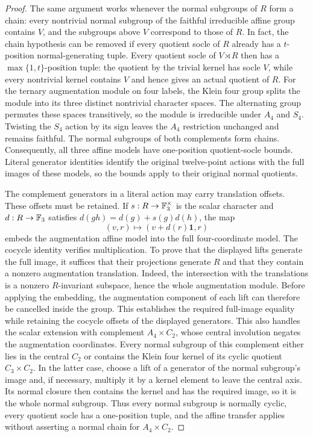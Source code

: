 \begin{proof}
The same argument works whenever the normal subgroups of $R$ form a
chain: every nontrivial normal subgroup of the faithful irreducible affine
group contains $V$, and the subgroups above $V$ correspond to those of $R$.
In fact, the chain hypothesis can be removed if every quotient socle of
$R$ already has a $t$-position normal-generating tuple. Every quotient
socle of $V\rtimes R$ then has a $\max\{1,t\}$-position tuple: the quotient
by the trivial kernel has socle $V$, while every nontrivial kernel contains
$V$ and hence gives an actual quotient of $R$.
For the ternary augmentation module on four labels, the Klein four group
splits the module into its three distinct nontrivial character spaces.
The alternating group permutes these spaces transitively, so the module
is irreducible under $A_4$ and $S_4$. Twisting the $S_4$ action by its sign
leaves the $A_4$ restriction unchanged and remains faithful. The normal
subgroups of both complements form chains. Consequently, all three
affine models have one-position quotient-socle bounds. Literal generator
identities identify the original twelve-point actions with the full
images of these models, so the bounds apply to their original normal
quotients.

The complement generators in a literal action may carry translation
offsets. These offsets must be retained. If $s:R\to\mathbb F_3^\times$ is the
scalar character and $d:R\to\mathbb F_3$ satisfies
$d(gh)=d(g)+s(g)d(h)$, the map
\[
 (v,r)\longmapsto (v+d(r)\mathbf{1},r)
\]
embeds the augmentation affine model into the full four-coordinate model.
The cocycle identity verifies multiplication. To prove that the displayed
lifts generate the full image, it suffices that their projections generate
$R$ and that they contain a nonzero augmentation translation. Indeed, the
intersection with the translations is a nonzero $R$-invariant subspace,
hence the whole augmentation module. Before applying the embedding,
the augmentation component of each lift can therefore be cancelled
inside the group. This establishes the required full-image equality
while retaining the cocycle offsets of the displayed generators.
This also handles the scalar extension with complement $A_4\times C_2$,
whose central involution negates the augmentation coordinates. Every normal
subgroup of this complement either lies in the central $C_2$ or contains
the Klein four kernel of its cyclic quotient $C_3\times C_2$. In the latter
case, choose a lift of a generator of the normal subgroup's image and,
if necessary, multiply it by a kernel element to leave the central axis.
Its normal closure then contains the kernel and has the required image,
so it is the whole normal subgroup. Thus every normal subgroup is normally
cyclic, every quotient socle has a one-position tuple, and the affine
transfer applies without asserting a normal chain for $A_4\times C_2$.


\end{proof}
